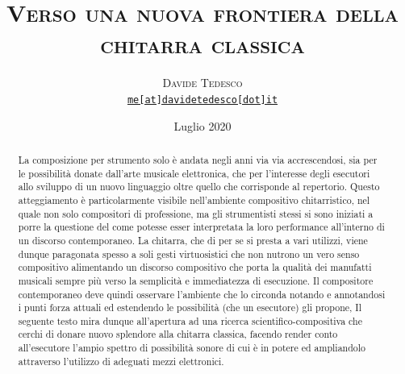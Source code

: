 \documentclass[oneside]{article}
\title{\vspace{-15mm}\fontsize{24pt}{10pt}\selectfont\textsf{\bfseries{\textsc{Verso una nuova frontiera della
 chitarra classica}}}} %
\author{
\large
\textsc{Davide Tedesco}\\
\small \href{mailto:me@davidetedesco.it}{\texttt{me[at]davidetedesco[dot]it}} 
}
\date{Luglio 2020}
\begin{document}
\maketitle %

\tableofcontents

\thispagestyle{empty} 

\vspace*{10mm}

\begin{abstract}

La composizione per strumento solo è andata negli anni via via accrescendosi, sia per le possibilità donate dall'arte musicale elettronica, che per l'interesse degli esecutori allo sviluppo di un nuovo linguaggio oltre quello che corrisponde al repertorio. Questo atteggiamento è particolarmente visibile nell'ambiente compositivo chitarristico, nel quale non solo compositori di professione, ma gli strumentisti stessi si sono iniziati a porre la questione del come potesse esser interpretata la loro performance all'interno di un discorso contemporaneo. La chitarra, che di per se si presta a vari utilizzi, viene dunque paragonata spesso a soli gesti virtuosistici che non nutrono un vero senso compositivo alimentando un discorso compositivo che porta la qualità dei manufatti musicali sempre più verso la semplicità e immediatezza di esecuzione. Il compositore contemporaneo deve quindi osservare l'ambiente che lo circonda notando e annotandosi i punti forza attuali ed estendendo le possibilità (che un esecutore) gli propone, Il seguente testo mira dunque all'apertura ad una ricerca scientifico-compositiva che cerchi di donare nuovo splendore alla chitarra classica, facendo render conto all'esecutore l'ampio spettro di possibilità sonore di cui è in potere ed ampliandolo attraverso l'utilizzo di adeguati mezzi elettronici.

\vspace*{4mm}
\end{abstract}


\hspace*{4mm}
\end{document}
